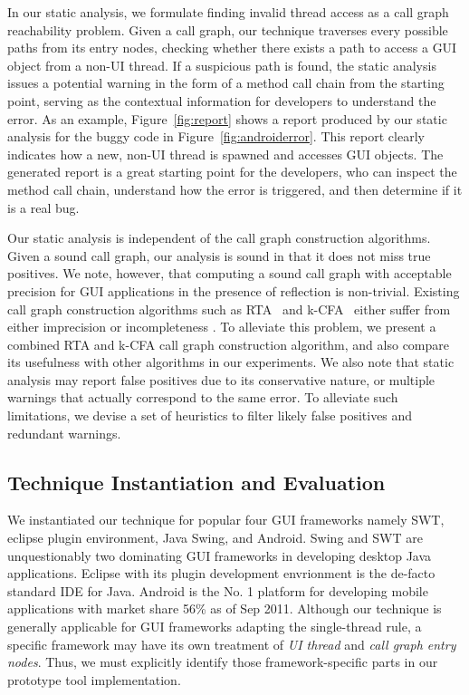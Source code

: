 In our static analysis, we formulate finding invalid thread access as a call graph reachability
problem. Given a call graph, our technique traverses
every possible paths from its entry nodes, checking whether
there exists a path to access a GUI object from a non-UI thread. If 
a suspicious path is found,
the static analysis issues a potential warning in the form of a method
call chain from the starting point, serving as the contextual information
for developers to understand the error.
As an example, Figure~\ref{fig:report} shows a report produced
by our static analysis for the buggy code in Figure~\ref{fig:androiderror}.
This report clearly indicates how a new, non-UI thread is spawned and
accesses GUI objects. 
The generated report is a great starting point for the developers, who can
inspect the method call chain, understand how the error
is triggered, and then determine if it is a real bug.

Our static analysis is independent of the call graph construction algorithms.
Given a sound call graph, our analysis is sound in that it does
not miss true positives. We note, however, that computing a sound
call graph with acceptable precision for GUI applications in the presence of reflection
is non-trivial.
Existing call graph construction algorithms such as RTA~\cite{} and k-CFA~\cite{}
either suffer from either imprecision or incompleteness .
To alleviate this problem,
we present a combined RTA and k-CFA call graph construction algorithm, and
also compare its usefulness with other algorithms in  our experiments. We
also note that static analysis may report false positives due to its
conservative nature, or multiple warnings that actually correspond
to the same error. To alleviate such limitations, we devise a set
 of heuristics to filter likely false positives and redundant warnings.

\subsection{Technique Instantiation and Evaluation}


We instantiated our technique for popular four GUI frameworks namely SWT,
eclipse plugin environment, Java Swing, and Android. 
Swing and SWT are unquestionably 
two dominating GUI frameworks in developing desktop Java applications.
Eclipse with its plugin development envrionment is the de-facto standard
IDE for Java. Android is the No. 1 platform for
developing mobile applications with market share 56\% as of Sep 2011.
Although our technique is generally applicable for GUI
frameworks adapting the single-thread rule, a specific framework
may have its own treatment of \textit{UI thread} and \textit{call graph
entry nodes}. Thus, we must explicitly identify those framework-specific
parts in our prototype tool implementation.

